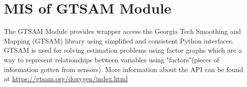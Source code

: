 \documentclass[12pt, titlepage]{article}
\begin{document}








\newpage

\section{MIS of GTSAM Module} \label{M_GTSAM} 


The GTSAM Module provides wrapper access the Georgia Tech Smoothing and Mapping (GTSAM) library using simplified and consistent Python interfaces. GTSAM is used for solving estimation problems using factor graphs which are a way to represent relationships between variables using "factors"(pieces of information gotten from sensors). More information about the API can be found at \url{https://gtsam.org/doxygen/index.html}
\end{document}
